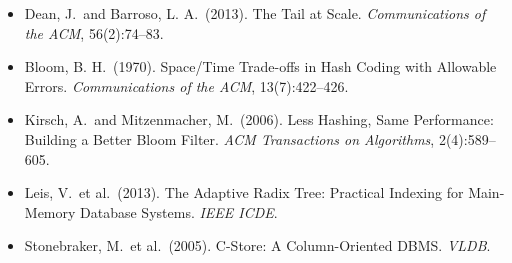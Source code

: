 \begin{itemize}
    \item Dean, J.\ and Barroso, L. A.\ (2013).  The Tail at Scale.
    \emph{Communications of the ACM}, 56(2):74--83.

    \item Bloom, B. H.\ (1970).  Space/Time Trade-offs in Hash Coding with
    Allowable Errors.  \emph{Communications of the ACM}, 13(7):422--426.

    \item Kirsch, A.\ and Mitzenmacher, M.\ (2006).  Less Hashing, Same
    Performance: Building a Better Bloom Filter.  \emph{ACM Transactions on
    Algorithms}, 2(4):589--605.

    \item Leis, V.\ et al.\ (2013).  The Adaptive Radix Tree: Practical Indexing
    for Main-Memory Database Systems.  \emph{IEEE ICDE}.

    \item Stonebraker, M.\ et al.\ (2005).  C-Store: A Column-Oriented DBMS.
    \emph{VLDB}.
\end{itemize}

